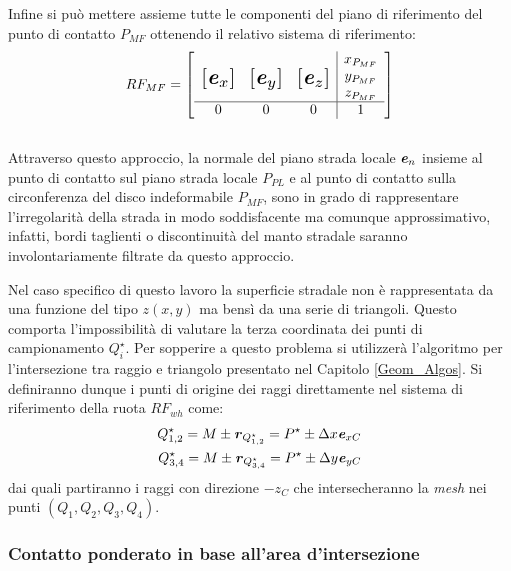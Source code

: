 Infine si può mettere assieme tutte le componenti del piano di riferimento del punto di contatto $P_{MF}$ ottenendo il relativo sistema di riferimento:
%
\begin{equation}
RF_{MF} = \left[
\begin{array}{ccc|c}
& & & x_{P_{MF}}\\
\multirow{3}{*}{\raisebox{20mm}{\scalebox{1.5}{$\left[\textbf{\textit{e}}_x\right]$}}} & \multirow{3}{*}{\raisebox{20mm}{\scalebox{1.5}{$\left[\textbf{\textit{e}}_y\right]$}}} & \multirow{3}{*}{\raisebox{20mm}{\scalebox{1.5}{$\left[\textbf{\textit{e}}_z\right]$}}} & y_{P_{MF}}\\
& & & z_{P_{MF}}\\ \hline
0 & 0 & 0 & 1
\end{array}\right]
\end{equation}\\
Attraverso questo approccio, la normale del piano strada locale $\textbf{\textit{e}}_{n}$ insieme al punto di contatto sul piano strada locale $P_{PL}$ e al punto di contatto sulla circonferenza del disco indeformabile $P_{MF}$, sono in grado di rappresentare l'irregolarità della strada in modo soddisfacente ma comunque approssimativo, infatti, bordi taglienti o discontinuità del manto stradale saranno involontariamente filtrate da questo approccio.

Nel caso specifico di questo lavoro la superficie stradale non è rappresentata da una funzione del tipo $z(x,y)$ ma bensì da una serie di triangoli. Questo comporta l'impossibilità di valutare la terza coordinata dei punti di campionamento $Q_i^\star$. Per sopperire a questo problema si utilizzerà l'algoritmo per l'intersezione tra raggio e triangolo presentato nel Capitolo \ref{Geom_Algos}. Si definiranno dunque i punti di origine dei raggi direttamente nel sistema di riferimento della ruota $RF_{wh}$ come:
\begin{equation}
\begin{split}
Q^\star_{1,2} = M \pm \textbf{\textit{r}}_{Q^\star_{1,2}} = P^\star \pm \Delta x \textbf{\textit{e}}_{xC} \\
Q^\star_{3,4} = M \pm \textbf{\textit{r}}_{Q^\star_{3,4}} = P^\star \pm \Delta y \textbf{\textit{e}}_{yC}
\end{split}
\end{equation}
dai quali partiranno i raggi con direzione $-z_C$ che intersecheranno la \textit{mesh} nei punti $(Q_1, Q_2, Q_3, Q_4)$.
%
\subsubsection{Contatto ponderato in base all'area d'intersezione}
%
